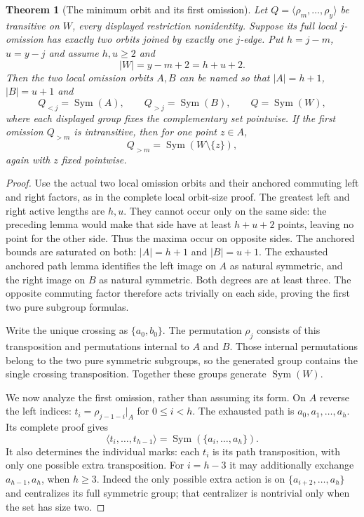 \documentclass[11pt,a4paper]{article}
\newtheorem{theorem}[lemma]{Theorem}
\newcommand{\gen}[1]{\langle#1\rangle}
\newcommand{\Sym}{\operatorname{Sym}}
\begin{document}
\begin{theorem}[The minimum orbit and its first omission]
Let $Q=\gen{\rho_m,\ldots,\rho_y}$ be transitive
on $W$, every displayed restriction nonidentity.
Suppose its full local $j$-omission has exactly
two orbits joined by exactly one $j$-edge. Put
$h=j-m$, $u=y-j$ and assume $h,u\ge2$ and
\[
                         |W|=y-m+2=h+u+2.
\]
Then the two local omission orbits $A,B$ can be
named so that $|A|=h+1$, $|B|=u+1$ and
\[
       Q_{<j}=\Sym(A),\qquad Q_{>j}=\Sym(B),
       \qquad Q=\Sym(W),
\]
where each displayed group fixes the complementary
set pointwise. If the first omission $Q_{>m}$
is intransitive, then for one point $z\in A$,
\[
                         Q_{>m}=\Sym(W\setminus\{z\}),
\]
again with $z$ fixed pointwise.
\end{theorem}
\begin{proof}
Use the actual two local omission orbits and their
anchored commuting left and right factors, as in
the complete local orbit-size proof. The greatest
left and right active lengths are $h,u$. They
cannot occur only on the same side: the preceding
lemma would make that side have at least $h+u+2$
points, leaving no point for the other side.
Thus the maxima occur on opposite sides. The
anchored bounds are saturated on both:
$|A|=h+1$ and $|B|=u+1$. The exhausted anchored
path lemma identifies the left image on $A$ as
natural symmetric, and the right image on $B$
as natural symmetric. Both degrees are at least
three. The opposite commuting factor therefore
acts trivially on each side, proving the first
two pure subgroup formulas.

Write the unique crossing as $\{a_0,b_0\}$.
The permutation $\rho_j$ consists of this
transposition and permutations internal to $A$
and $B$. Those internal permutations belong to
the two pure symmetric subgroups, so the generated
group contains the single crossing transposition.
Together these groups generate $\Sym(W)$.

We now analyze the first omission, rather than
assuming its form. On $A$ reverse the left indices:
$t_i=\rho_{j-1-i}|_A$ for $0\le i<h$.
The exhausted path is $a_0,a_1,\ldots,a_h$.
Its complete proof gives
\[
 \gen{t_i,\ldots,t_{h-1}}
       =\Sym(\{a_i,\ldots,a_h\}).
\]
It also determines the individual marks: each
$t_i$ is its path transposition, with only one
possible extra transposition. For $i=h-3$ it
may additionally exchange $a_{h-1},a_h$, when
$h\ge3$. Indeed the only possible extra action
is on $\{a_{i+2},\ldots,a_h\}$ and centralizes
its full symmetric group; that centralizer is
nontrivial only when the set has size two.


\end{proof}
\end{document}
